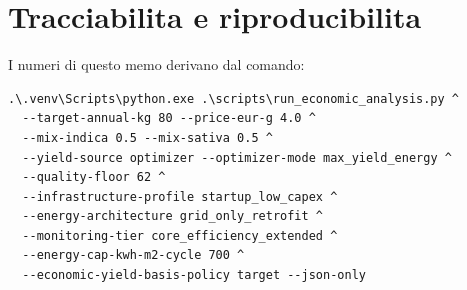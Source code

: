\documentclass[11pt,a4paper]{article}
\begin{document}
\section*{Tracciabilita e riproducibilita}
I numeri di questo memo derivano dal comando:
\begin{verbatim}
.\.venv\Scripts\python.exe .\scripts\run_economic_analysis.py ^
  --target-annual-kg 80 --price-eur-g 4.0 ^
  --mix-indica 0.5 --mix-sativa 0.5 ^
  --yield-source optimizer --optimizer-mode max_yield_energy ^
  --quality-floor 62 ^
  --infrastructure-profile startup_low_capex ^
  --energy-architecture grid_only_retrofit ^
  --monitoring-tier core_efficiency_extended ^
  --energy-cap-kwh-m2-cycle 700 ^
  --economic-yield-basis-policy target --json-only
\end{verbatim}
\end{document}
